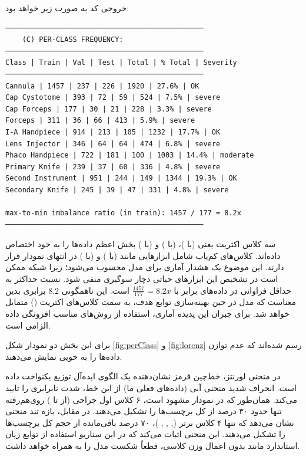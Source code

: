 \documentclass{article}
\begin{document}
خروجی کد به صورت زیر خواهد بود:
\begin{latin}
\begin{LTR}
\begin{verbatim}
───────────────────────────────────────────────
    (C) PER-CLASS FREQUENCY:    
───────────────────────────────────────────────
Class | Train | Val | Test | Total | % Total | Severity
───────────────────────────────────────────────
Cannula | 1457 | 237 | 226 | 1920 | 27.6% | OK
Cap Cystotome | 393 | 72 | 59 | 524 | 7.5% | severe
Cap Forceps | 177 | 30 | 21 | 228 | 3.3% | severe
Forceps | 311 | 36 | 66 | 413 | 5.9% | severe
I-A Handpiece | 914 | 213 | 105 | 1232 | 17.7% | OK
Lens Injector | 346 | 64 | 64 | 474 | 6.8% | severe
Phaco Handpiece | 722 | 181 | 100 | 1003 | 14.4% | moderate
Primary Knife | 239 | 37 | 60 | 336 | 4.8% | severe
Second Instrument | 951 | 244 | 149 | 1344 | 19.3% | OK
Secondary Knife | 245 | 39 | 47 | 331 | 4.8% | severe

max-to-min imbalance ratio (in train): 1457 / 177 = 8.2x
───────────────────────────────────────────────
\end{verbatim}
\end{LTR}
\end{latin}
سه کلاس اکثریت یعنی  (با )،  (با ) و  (با ) بخش اعظم داده‌ها را به خود اختصاص داده‌اند.  کلاس‌های کم‌یاب شامل ابزارهایی مانند  (با ) و  (با ) در انتهای نمودار قرار دارند. این موضوع یک هشدار آماری برای مدل محسوب می‌شود؛ زیرا شبکه ممکن است در تشخیص این ابزارهای حیاتی دچار سوگیری منفی شود.
نسبت حداکثر به حداقل فراوانی  در داده‌های  برابر با $\frac{1457}{177} = 8.2x$ است. این ناهمگونی $8.2$ برابری بدین معناست که مدل در حین بهینه‌سازی توابع هدف، به سمت کلاس‌های اکثریت () متمایل خواهد شد. برای جبران این پدیده آماری، استفاده از روش‌های مناسب افزونگی داده الزامی است.

برای این بخش دو نمودار شکل \ref{fig:perClass} و \ref{fig:lorenz} رسم شده‌اند که عدم توازن داده‌ها را به خوبی نمایش می‌دهند. 

در منحنی لورنتز، خط‌چین قرمز نشان‌دهنده یک الگوی ایده‌آل توزیع یکنواخت داده است. انحراف شدید منحنی آبی (داده‌های فعلی ما) از این خط، شدت نابرابری را تایید می‌کند.
همان‌طور که در نمودار مشهود است، ۶ کلاس اول جراحی (از  تا ) روی‌هم‌رفته تنها حدود ۳۰ درصد از کل برچسب‌ها را تشکیل می‌دهند. در مقابل، بازه تند منحنی نشان می‌دهد که تنها ۴ کلاس برتر (, , , )، ۷۰ درصد باقی‌مانده از حجم کل برچسب‌ها را تشکیل می‌دهند. این منحنی اثبات می‌کند که در این سناریو استفاده از توابع زیان استاندارد مانند  بدون اعمال وزن کلاسی، قطعاً شکست مدل را به همراه خواهد داشت. 
\end{document}
